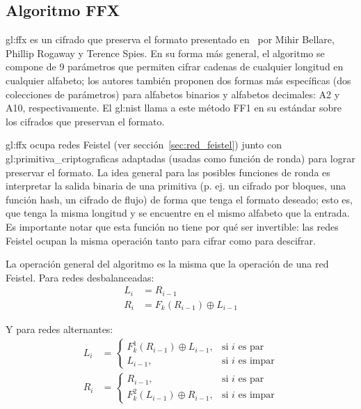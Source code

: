 %
%

\subsection{Algoritmo FFX}
\label{sec:ffx}

\Gls{gl:ffx} es un cifrado que preserva el formato presentado en~\cite{ffx_1}
por Mihir Bellare, Phillip Rogaway y Terence Spies.  En su forma más general,
el algoritmo se compone de 9 parámetros que permiten cifrar cadenas de
cualquier longitud en cualquier alfabeto; los autores también proponen dos
formas más específicas (dos colecciones de parámetros) para alfabetos binarios
y alfabetos decimales: A2 y A10, respectivamente. El \gls{gl:nist} llama a este
método FF1 en su estándar sobre los cifrados que preservan el
formato\cite{nist_fpe}.

\Gls{gl:ffx} ocupa redes Feistel (ver sección~\ref{sec:red_feistel}) junto con
\glspl{gl:primitiva_criptografica} adaptadas (usadas como función de ronda) para
lograr preservar el formato. La idea general para las posibles funciones de
ronda es interpretar la salida binaria de una primitiva (p. ej. un cifrado por
bloques, una función hash, un cifrado de flujo) de forma que tenga el formato
deseado; esto es, que tenga la misma longitud y se encuentre en el mismo
alfabeto que la entrada. Es importante notar que esta función no tiene por qué
ser invertible: las redes Feistel ocupan la misma operación tanto para cifrar
como para descifrar.

La operación general del algoritmo es la misma que la operación de una red
Feistel. Para redes desbalanceadas:
\begin{equation}
  \begin{split}
    L_{i} &= R_{i - 1} \\
    R_{i} &= F_k(R_{i - 1}) \oplus L_{i - 1}
  \end{split}
\end{equation}

Y para redes alternantes:
\begin{equation}
  \begin{split}
    L_{i} &=
    \begin{cases}
      F^1_k(R_{i - 1}) \oplus L_{i - 1},  & \text{si } i \text{ es par} \\
      L_{i - 1},                          & \text{si } i \text{ es impar}
    \end{cases}
    \\
    R_{i} &=
    \begin{cases}
      R_{i - 1},                          & \text{si } i \text{ es par} \\
      F^2_k(L_{i - 1}) \oplus R_{i - 1},  & \text{si } i \text{ es impar}
    \end{cases}
  \end{split}
\end{equation}

